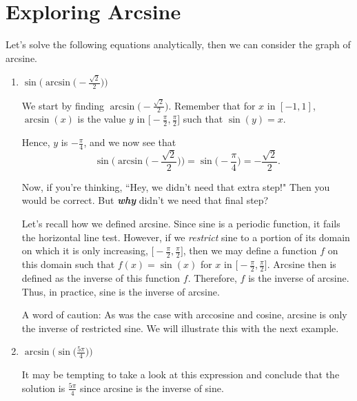\documentclass{ximera}
\begin{document}
\section{Exploring Arcsine}

\begin{example}
Let's solve the following equations analytically, then we can consider the graph of arcsine.

\begin{enumerate}
\item $\sin\!\Big(\!\arcsin\!\Big(\!-\frac{\sqrt{2}}{2}\Big)\Big)$\\
\begin{explanation}
We start by finding $\arcsin\!\Big(\!\!-\!\frac{\sqrt{2}}{2}\Big)$. Remember that for $x$ in $[-1,1]$, $\arcsin(x)$ is the value $y$ in $\Big[-\frac{\pi}{2},\frac{\pi}{2}\Big]$ such that $\sin(y) = x$. 

Hence, $y$ is $-\frac{\pi}{4}$, and we now see that 
\begin{equation*}
\sin\!\Big(\!\arcsin\!\Big(\!\!-\!\frac{\sqrt{2}}{2}\Big)\Big) = \sin\Big(\!-\frac{\pi}{4}\Big) = -\frac{\sqrt{2}}{2}.
\end{equation*}

Now, if you're thinking, ``Hey, we didn't need that extra step!" Then you would be correct. But \textbf{\textit{why}} didn't we need that final step?

Let's recall how we defined arcsine. Since sine is a periodic function, it fails the horizontal line test. However, if we {\it restrict} sine to a portion of its domain on which it is only increasing, $\Big[-\frac{\pi}{2},\frac{\pi}{2}\Big]$, then we may define a function $f$ on this domain such that $f(x) = \sin(x)$ for $x$ in $\Big[-\frac{\pi}{2},\frac{\pi}{2}\Big]$. Arcsine then is defined as the inverse of this function $f$. Therefore, $f$ is the inverse of arcsine. 
Thus, in practice, sine is the inverse of arcsine. 

A word of caution: As was the case with arccosine and cosine, arcsine is only the inverse of restricted sine. We will illustrate this with the next example.
\end{explanation}


\item $\arcsin\!\Big(\sin\!\Big(\frac{5\pi}{4}\Big)\Big)$

\begin{explanation}
It may be tempting to take a look at this expression and conclude that the solution is $\frac{5\pi}{4}$ since arcsine is the inverse of sine. 


\end{explanation}
\end{enumerate}
\end{example}
\end{document}
